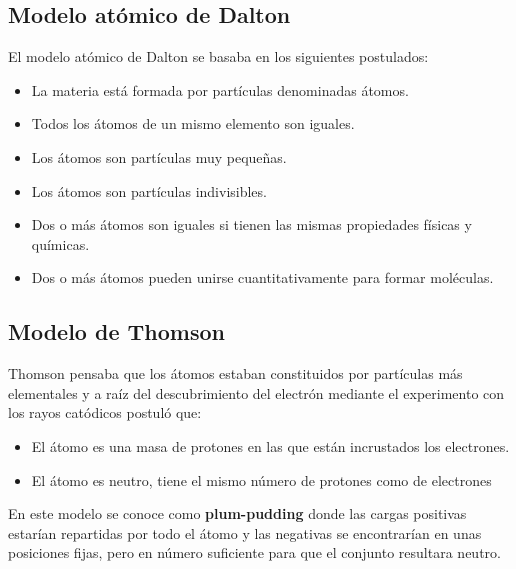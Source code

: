 \subsection{Modelo atómico de Dalton}
El modelo atómico de Dalton se basaba en los siguientes postulados:
\begin{itemize}
    \item La materia está formada por partículas denominadas átomos.
    \item Todos los átomos de un mismo elemento son iguales.
    \item Los átomos son partículas muy pequeñas.
    \item Los átomos son partículas indivisibles.
    \item Dos o más átomos son iguales si tienen las mismas propiedades físicas y químicas.
    \item Dos o más átomos pueden unirse cuantitativamente para formar moléculas.
\end{itemize}

\subsection{Modelo de Thomson}\label{subsec:modelo-de-thomson}
Thomson pensaba que los átomos estaban constituidos por partículas más elementales y a raíz del descubrimiento del electrón mediante el experimento con los rayos catódicos postuló que:
\begin{itemize}
    \item El átomo es una masa de protones en las que están incrustados los electrones.
    \item El átomo es neutro, tiene el mismo número de protones como de electrones
\end{itemize}

En este modelo se conoce como \textbf{plum-pudding} donde las cargas positivas estarían repartidas por todo el átomo y las negativas se encontrarían en unas posiciones fijas, pero en número suficiente para que el conjunto resultara neutro.

